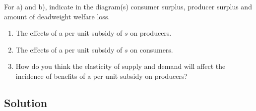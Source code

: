 \documentclass[12pt]{article}
\begin{document}
For a) and b), indicate in the diagram(s) consumer surplus, producer surplus and amount of deadweight welfare loss.
\begin{enumerate}[label=(\alph*), leftmargin=*]
  \item The effects of a per unit subsidy of \(s\) on producers.
  \item The effects of a per unit subsidy of \(s\) on consumers.
  \item How do you think the elasticity of supply and demand will affect the incidence of benefits of a per unit subsidy on producers?
\end{enumerate}
\newpage
\subsection{Solution}
\end{document}
